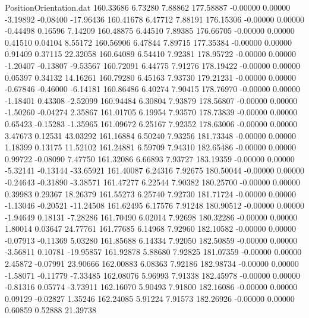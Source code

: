 \begin{filecontents}{PositionOrientation.dat}
 160.33686    6.73280    7.88862   177.58887   -0.00000    0.00000   -3.19892   -0.08400  -17.96436
 160.41678    6.47712    7.88191   176.15306   -0.00000    0.00000   -0.44498    0.16596    7.14209
 160.48875    6.44510    7.89385   176.66705   -0.00000    0.00000    0.41510    0.04104    8.55172
 160.56906    6.47844    7.89715   177.35384   -0.00000    0.00000    0.91409    0.37115   22.32058
 160.64089    6.54410    7.92381   178.95722   -0.00000    0.00000   -1.20407   -0.13807   -9.53567
 160.72091    6.44775    7.91276   178.19422   -0.00000    0.00000    0.05397    0.34132   14.16261
 160.79280    6.45163    7.93730   179.21231   -0.00000    0.00000   -0.67846   -0.46000   -6.14181
 160.86486    6.40274    7.90415   178.76970   -0.00000    0.00000   -1.18401    0.43308   -2.52099
 160.94484    6.30804    7.93879   178.56807   -0.00000    0.00000   -1.50260   -0.04274    2.35867
 161.01705    6.19954    7.93570   178.73839   -0.00000    0.00000    0.65423   -0.15283   -1.35965
 161.09672    6.25167    7.92352   178.63006   -0.00000    0.00000    3.47673    0.12531   43.03292
 161.16884    6.50240    7.93256   181.73348   -0.00000    0.00000    1.18399    0.13175   11.52102
 161.24881    6.59709    7.94310   182.65486   -0.00000    0.00000    0.99722   -0.08090    7.47750
 161.32086    6.66893    7.93727   183.19359   -0.00000    0.00000   -5.32141   -0.13144  -33.65921
 161.40087    6.24316    7.92675   180.50044   -0.00000    0.00000   -0.24643   -0.31890   -3.38571
 161.47277    6.22544    7.90382   180.25700   -0.00000    0.00000    0.39983    0.29367   18.26379
 161.55273    6.25740    7.92730   181.71724   -0.00000    0.00000   -1.13046   -0.20521  -11.24508
 161.62495    6.17576    7.91248   180.90512   -0.00000    0.00000   -1.94649    0.18131   -7.28286
 161.70490    6.02014    7.92698   180.32286   -0.00000    0.00000    1.80014    0.03647   24.77761
 161.77685    6.14968    7.92960   182.10582   -0.00000    0.00000   -0.07913   -0.11369    5.03280
 161.85688    6.14334    7.92050   182.50859   -0.00000    0.00000   -3.56811    0.10781  -19.95857
 161.92878    5.88680    7.92825   181.07359   -0.00000    0.00000    2.45872   -0.07991   23.90666
 162.00883    6.08363    7.92186   182.98734   -0.00000    0.00000   -1.58071   -0.11779   -7.33485
 162.08076    5.96993    7.91338   182.45978   -0.00000    0.00000   -0.81316    0.05774   -3.73911
 162.16070    5.90493    7.91800   182.16086   -0.00000    0.00000    0.09129   -0.02827    1.35246
 162.24085    5.91224    7.91573   182.26926   -0.00000    0.00000    0.60859    0.52888   21.39738

\end{filecontents}
